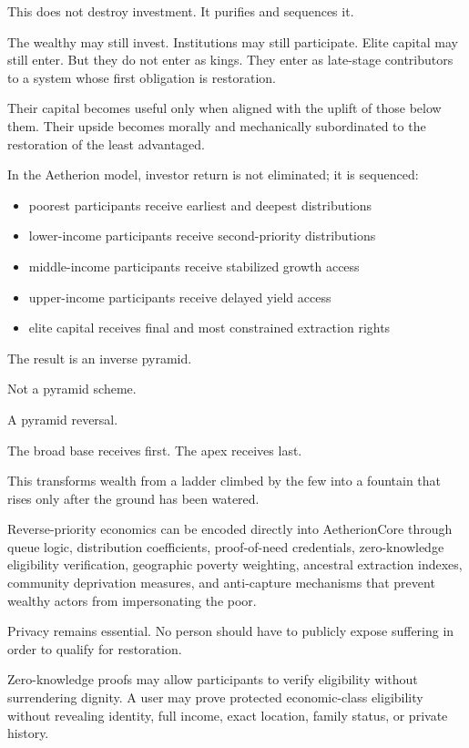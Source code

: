 ﻿\documentclass[12pt]{article}
\begin{document}
This does not destroy investment. It purifies and sequences it.

The wealthy may still invest. Institutions may still participate. Elite capital may still enter. But they do not enter as kings. They enter as late-stage contributors to a system whose first obligation is restoration.

Their capital becomes useful only when aligned with the uplift of those below them. Their upside becomes morally and mechanically subordinated to the restoration of the least advantaged.

In the Aetherion model, investor return is not eliminated; it is sequenced:

\begin{itemize}
  \item poorest participants receive earliest and deepest distributions
  \item lower-income participants receive second-priority distributions
  \item middle-income participants receive stabilized growth access
  \item upper-income participants receive delayed yield access
  \item elite capital receives final and most constrained extraction rights
\end{itemize}

The result is an inverse pyramid.

Not a pyramid scheme.

A pyramid reversal.

The broad base receives first. The apex receives last.

This transforms wealth from a ladder climbed by the few into a fountain that rises only after the ground has been watered.

Reverse-priority economics can be encoded directly into AetherionCore through queue logic, distribution coefficients, proof-of-need credentials, zero-knowledge eligibility verification, geographic poverty weighting, ancestral extraction indexes, community deprivation measures, and anti-capture mechanisms that prevent wealthy actors from impersonating the poor.

Privacy remains essential. No person should have to publicly expose suffering in order to qualify for restoration.

Zero-knowledge proofs may allow participants to verify eligibility without surrendering dignity. A user may prove protected economic-class eligibility without revealing identity, full income, exact location, family status, or private history.
\end{document}
